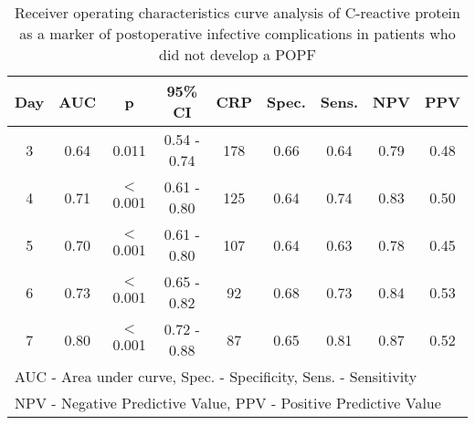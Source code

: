 \begin{table}[h]
	\centering
	\caption{Receiver operating characteristics curve analysis of C-reactive protein as a marker of postoperative infective complications in patients who did not develop a POPF}
	\label{table:crp_comp_ROC_infections_noPOPF}
	\renewcommand{\arraystretch}{1.2} %
	\begin{tabular}{| c | c c c | c c c c c |}
		\hline
		Day & AUC  & p        & 95\% CI     & CRP & Spec. & Sens. & NPV  & PPV               \\ \hline
		3   & 0.64 & 0.011    & 0.54 - 0.74 & 178 & 0.66  & 0.64  & 0.79 & 0.48              \\
		4   & 0.71 & $<$0.001 & 0.61 - 0.80 & 125 & 0.64  & 0.74  & 0.83 & 0.50              \\
		5   & 0.70 & $<$0.001 & 0.61 - 0.80 & 107 & 0.64  & 0.63  & 0.78 & 0.45              \\
		6   & 0.73 & $<$0.001 & 0.65 - 0.82 & 92  & 0.68  & 0.73  & 0.84 & 0.53              \\
		7   & 0.80 & $<$0.001 & 0.72 - 0.88 & 87  & 0.65  & 0.81  & 0.87 & 0.52              \\ \hline
		\multicolumn{9}{l}{AUC - Area under curve, Spec. - Specificity, Sens. - Sensitivity} \\
		\multicolumn{9}{l}{NPV - Negative Predictive Value, PPV - Positive Predictive Value}
	\end{tabular}
\end{table}